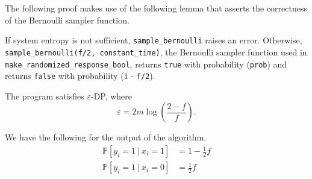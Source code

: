\documentclass{article}
\begin{document}
\begin{tcolorbox}
\begin{note}
The following proof makes use of the following lemma that asserts the correctness of the Bernoulli sampler function.
    \begin{lemma}
    If system entropy is not sufficient, \texttt{sample\_bernoulli} raises an error. 
    Otherwise, \texttt{sample\_bernoulli(f/2, constant\_time)}, the Bernoulli sampler function used in \texttt{make\_randomized\_response\_bool}, 
    returns \texttt{true} with probability (\texttt{prob}) and returns  \texttt{false} with probability (1 - \texttt{f/2}).
    \end{lemma}
\end{note}
\end{tcolorbox}
\begin{theorem}
\label{thm:privacy-parameter}
	The program  satisfies $\varepsilon$-DP, where 
	\begin{equation*}
		\varepsilon = 2m\log\left(\frac{2-f}{f}\right).
	\end{equation*}
\end{theorem}
\begin{lemma}
    We have the following for the output of the algorithm.
	\begin{align}
		\mathbb{P}[y_i = 1~|~x_i=1] &= 1 - \frac{1}{2}f\\
		\mathbb{P}[y_i = 1~|~x_i=0] &=\frac{1}{2}f
	\end{align}
\end{lemma}
\end{document}
